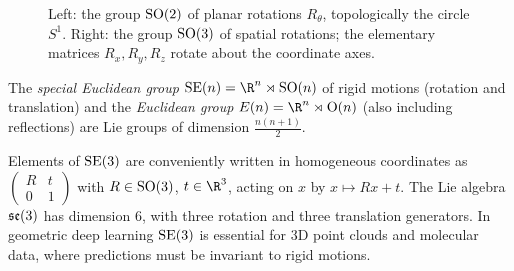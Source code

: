\begin{figure}[h]
\centering
{}
\caption[Rotations in the plane and in space]{Left: the group $\operatorname{SO}(2)$ of planar
rotations $R_\theta$, topologically the circle $S^1$. Right: the group $\operatorname{SO}(3)$
of spatial rotations; the elementary matrices $R_x, R_y, R_z$ rotate about the
coordinate axes.}
\label{fig:found:rotations}
\end{figure}

\begin{definition}
\label{def:found:euclidean-groups}
The \emph{special Euclidean group} $\SE(n) = \R^n \rtimes \SO(n)$ of rigid
motions (rotation and translation) and the \emph{Euclidean group}
$E(n) = \R^n \rtimes \Orth(n)$ (also including reflections) are Lie groups of
dimension $\frac{n(n+1)}{2}$.
\end{definition}

Elements of $\operatorname{SE}(3)$ are conveniently written in homogeneous coordinates as
$\left(\begin{smallmatrix} R & t \\ 0 & 1\end{smallmatrix}\right)$ with
$R \in \operatorname{SO}(3)$, $t \in \R^3$, acting on $x$ by $x \mapsto Rx + t$. The Lie algebra
$\mathfrak{se}(3)$ has dimension $6$, with three rotation and three translation
generators. In geometric deep learning $\operatorname{SE}(3)$ is essential for 3D point clouds
and molecular data, where predictions must be invariant to rigid motions.

